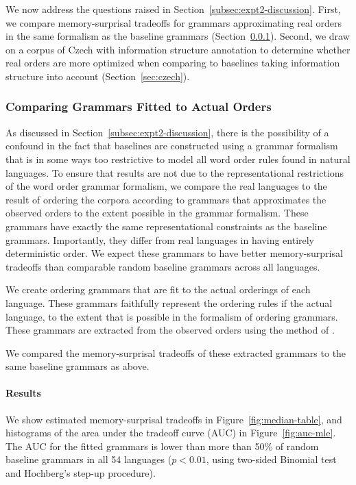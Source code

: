

We now address the questions raised in Section~\ref{subsec:expt2-discussion}.
First, we compare memory-surprisal tradeoffs for grammars approximating real orders in the same formalism as the baseline grammars (Section~\ref{sec:compare-mle}).
Second, we draw on a corpus of Czech with information structure annotation to determine whether real orders are more optimized when comparing to baselines taking information structure into account (Section~\ref{sec:czech}).


\subsubsection{Comparing Grammars Fitted to Actual Orders}\label{sec:compare-mle}

As discussed in Section~\ref{subsec:expt2-discussion}, there is the possibility of a confound in the fact that baselines are constructed using a grammar formalism that is in some ways too restrictive to model all word order rules found in natural languages.
To ensure that results are not due to the representational restrictions of the word order grammar formalism, we compare the real languages to the result of ordering the corpora according to grammars that approximates the observed orders to the extent possible in the grammar formalism.
These grammars have exactly the same representational constraints as the baseline grammars.
Importantly, they differ from real languages in having entirely deterministic order.
We expect these grammars to have better memory-surprisal tradeoffs than comparable random baseline grammars across all languages.

We create ordering grammars that are fit to the actual orderings of each language.
These grammars faithfully represent the ordering rules if the actual language, to the extent that is possible in the formalism of ordering grammars.
These grammars are extracted from the observed orders using the method of \cite{hahn2020universals}.

We compared the memory-surprisal tradeoffs of these extracted grammars to the same baseline grammars as above.


\paragraph{Results}


We show estimated memory-surprisal tradeoffs in Figure~\ref{fig:median-table}, and histograms of the area under the tradeoff curve (AUC) in Figure~\ref{fig:auc-mle}.
The AUC for the fitted grammars is lower than more than 50\% of random baseline grammars in all 54 languages ($p < 0.01$, using two-sided Binomial test and Hochberg's step-up procedure).

